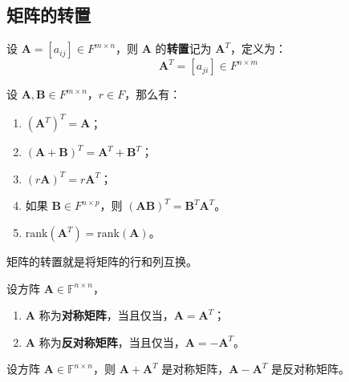 \vspace{1em}
\subsection{矩阵的转置}
\begin{definition}
    设 $\mathbf{A} = [a_{ij}] \in F^{m \times n}$，则 $\mathbf{A}$ 的\textbf{转置}记为 $\mathbf{A}^T$，定义为：
    \[
        \mathbf{A}^T = [a_{ji}] \in F^{n \times m}
    \]
    \label{def:matrix_transpose}
\end{definition}

\begin{proposition}[矩阵转置的性质]
    设 $\mathbf{A},\mathbf{B} \in F^{m \times n}$，$r\in F$，那么有：
    \begin{enumerate}
        \item $(\mathbf{A}^T)^T = \mathbf{A}$；
        \item $(\mathbf{A} + \mathbf{B})^T = \mathbf{A}^T + \mathbf{B}^T$；
        \item $(r\mathbf{A})^T = r\mathbf{A}^T$；
        \item 如果 $\mathbf{B} \in F^{n \times p}$，则 $(\mathbf{A}\mathbf{B})^T = \mathbf{B}^T\mathbf{A}^T$。
        \item $\mathrm{rank}(\mathbf{A}^T) = \mathrm{rank}(\mathbf{A})$。
    \end{enumerate}
\end{proposition}

\begin{note}
    矩阵的转置就是将矩阵的行和列互换。
\end{note}

\vspace{1em}

\begin{definition}
    设方阵 $\mathbf{A} \in \mathbb{F}^{n \times n}$，
    \begin{enumerate}
        \item $\mathbf{A}$ 称为\textbf{对称矩阵}，当且仅当，$\mathbf{A} = \mathbf{A}^T$；
        \item $\mathbf{A}$ 称为\textbf{反对称矩阵}，当且仅当，$\mathbf{A} = -\mathbf{A}^T$。
    \end{enumerate}
    \label{def:symmetric_skew_symmetric_matrix}
\end{definition}

\begin{proposition}
    设方阵 $\mathbf{A} \in \mathbb{F}^{n \times n}$，则 $\mathbf{A} + \mathbf{A}^T$ 是对称矩阵，$\mathbf{A} - \mathbf{A}^T$ 是反对称矩阵。
\end{proposition}

